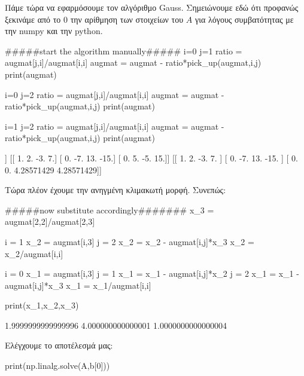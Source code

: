 Πάμε τώρα να εφαρμόσουμε τον αλγόριθμο {\en Gauss}. Σημειώνουμε εδώ ότι προφανώς ξεκινάμε από το $0$ την αρίθμηση των στοιχείων του $Α$ για λόγους συμβατότητας με την {\en numpy} και την {\en python}.

\en
\begin{python}
#####start the algorithm manually#####
i=0
j=1
ratio = augmat[j,i]/augmat[i,i]
augmat = augmat - ratio*pick_up(augmat,i,j)
print(augmat)

i=0
j=2
ratio = augmat[j,i]/augmat[i,i]
augmat = augmat - ratio*pick_up(augmat,i,j)
print(augmat)

i=1
j=2
ratio = augmat[j,i]/augmat[i,i]
augmat = augmat - ratio*pick_up(augmat,i,j)
print(augmat)
\end{python}
\vspace*{-0.7cm}
\begin{codeout}
[[  1.   2.  -3.   7.]
 [  0.  -7.  13. -15.]
 [ -2.   1.   1.   1.]]
[[  1.   2.  -3.   7.]
 [  0.  -7.  13. -15.]
 [  0.   5.  -5.  15.]]
[[  1.           2.          -3.           7.        ]
 [  0.          -7.          13.         -15.        ]
 [  0.           0.           4.28571429   4.28571429]]
\end{codeout}
\gr 
Τώρα πλέον έχουμε την ανηγμένη κλιμακωτή μορφή. Συνεπώς:
\en
\begin{python}
#####now substitute accordingly#######
x_3 = augmat[2,2]/augmat[2,3]

i = 1
x_2 = augmat[i,3]
j = 2
x_2 = x_2 - augmat[i,j]*x_3
x_2 = x_2/augmat[i,i]

i = 0
x_1 = augmat[i,3]
j = 1
x_1 = x_1 - augmat[i,j]*x_2
j = 2
x_1 = x_1 - augmat[i,j]*x_3
x_1 = x_1/augmat[i,i]

print(x_1,x_2,x_3)
\end{python}
\vspace*{-0.7cm}
\begin{codeout}
1.9999999999999996 4.000000000000001 1.0000000000000004
\end{codeout}
\gr
Ελέγχουμε το αποτέλεσμά μας:
\en
\begin{python}
print(np.linalg.solve(A,b[0]))
\end{python}
\vspace*{-0.7cm}
\begin{codeout}
[2. 4. 1.]
\end{codeout}
\gr